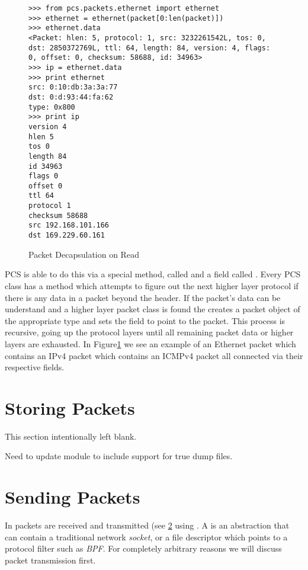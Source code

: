 \documentclass[11pt]{article}
\begin{document}
\begin{figure}
  \centering
\begin{verbatim}
>>> from pcs.packets.ethernet import ethernet
>>> ethernet = ethernet(packet[0:len(packet)])
>>> ethernet.data
<Packet: hlen: 5, protocol: 1, src: 3232261542L, tos: 0, dst: 2850372769L, ttl: 64, length: 84, version: 4, flags: 0, offset: 0, checksum: 58688, id: 34963>
>>> ip = ethernet.data
>>> print ethernet
src: 0:10:db:3a:3a:77
dst: 0:d:93:44:fa:62
type: 0x800
>>> print ip
version 4
hlen 5
tos 0
length 84
id 34963
flags 0
offset 0
ttl 64
protocol 1
checksum 58688
src 192.168.101.166
dst 169.229.60.161

\end{verbatim}
  \caption{Packet Decapsulation on Read}
  \label{fig:packet-decapsulation-on-read}
\end{figure}

PCS is able to do this via a special method, called  and
a field called .  Every PCS class has a 
method which attempts to figure out the next higher layer protocol if
there is any data in a packet beyond the header.  If the packet's data
can be understand and a higher layer packet class is found the
 creates a packet object of the appropriate type and
sets the  field to point to the packet.  This process is
recursive, going up the protocol layers until all remaining packet
data or higher layers are exhausted.  In
Figure\ref{fig:packet-decapsulation-on-read} we see an example of an
Ethernet packet which contains an IPv4 packet which contains an ICMPv4
packet all connected via their respective  fields.

\section{Storing Packets}

This section intentionally left blank.

Need to update  module to include support for true dump
files.

\section{Sending Packets}
\label{sec:sending-packets}

In  packets are received and transmitted (see
\ref{sec:sending-packets} using .  A
 is an abstraction that can contain a traditional
network \emph{socket}, or a file descriptor which points to a protocol
filter such as \emph{BPF}.  For completely arbitrary reasons we will
discuss packet transmission first.
\end{document}
